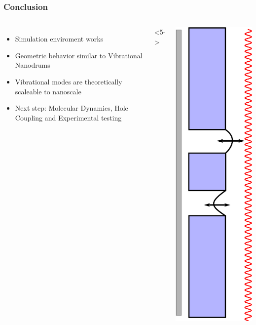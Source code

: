 \documentclass[hyperref={colorlinks=true,urlcolor=blue,linkcolor=.},aspectratio=1610,mathserif]{beamer}
\begin{document}
\begin{frame}
 \frametitle{Conclusion}
 \begin{columns}[T]
  \begin{itemize}
   \item<2-> Simulation enviroment works
   \item<3-> Geometric behavior similar to Vibrational Nanodrums
   \item<4-> Vibrational modes are theoretically scaleable to nanoscale
   \item<5-> Next step: Molecular Dynamics, Hole Coupling and Experimental testing
  \end{itemize}
  <5->
  \begin{center}
   \includegraphics[height=0.6\textheight]{Figures/Fuck_dig_christoffer.eps}

\end{center}
\end{columns}
\end{frame}
\end{document}
